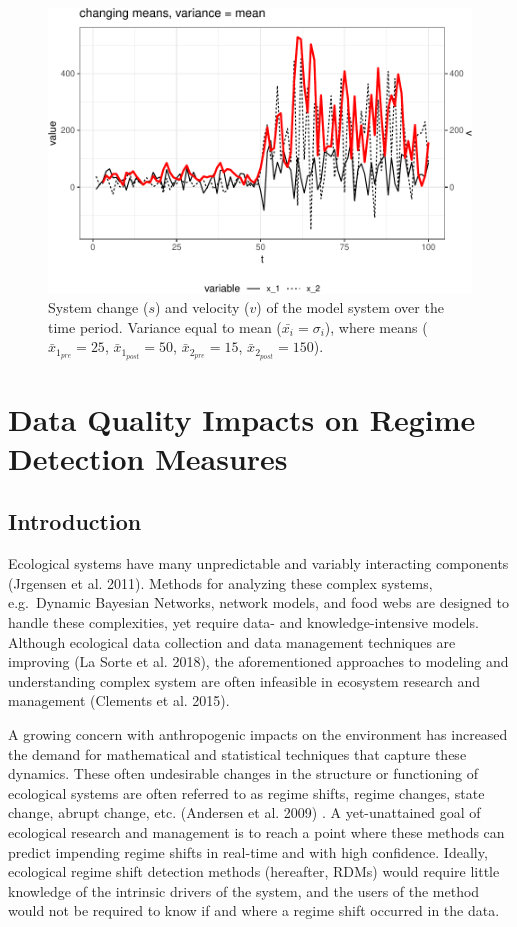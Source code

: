 \documentclass[12pt,twoside,openany]{reedthesis}
\begin{document}
\begin{figure}
\centering
\includegraphics{_myDissertation_files/figure-latex/velocSysEx4-1.pdf}
\caption{\label{fig:velocSysEx4}System change (\(s\)) and velocity (\(v\))
of the model system over the time period. Variance equal to mean
(\(\bar{x_i}=\sigma_i\)), where means (\(\bar{x}_{1_{pre}}=25\),
\(\bar{x}_{1_{post}}=50\), \(\bar{x}_{2_{pre}}=15\),
\(\bar{x}_{2_{post}}=150\)).}
\end{figure}
\chapter{Data Quality Impacts on Regime Detection
Measures}\label{resampling}

\section{Introduction}\label{introduction-4}

Ecological systems have many unpredictable and variably interacting
components (Jrgensen et al. 2011). Methods for analyzing these complex
systems, e.g.~Dynamic Bayesian Networks, network models, and food webs
are designed to handle these complexities, yet require data- and
knowledge-intensive models. Although ecological data collection and data
management techniques are improving (La Sorte et al. 2018), the
aforementioned approaches to modeling and understanding complex system
are often infeasible in ecosystem research and management (Clements et
al. 2015).

A growing concern with anthropogenic impacts on the environment has
increased the demand for mathematical and statistical techniques that
capture these dynamics. These often undesirable changes in the structure
or functioning of ecological systems are often referred to as regime
shifts, regime changes, state change, abrupt change, etc. (Andersen et
al. 2009) . A yet-unattained goal of ecological research and management
is to reach a point where these methods can predict impending regime
shifts in real-time and with high confidence. Ideally, ecological regime
shift detection methods (hereafter, RDMs) would require little knowledge
of the intrinsic drivers of the system, and the users of the method
would not be required to know if and where a regime shift occurred in
the data.
\end{document}
